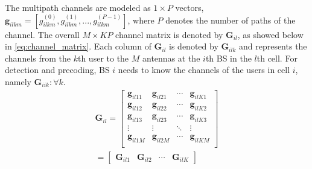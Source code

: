 \documentclass[journal,12pt,onecolumn]{IEEEtran}
\begin{document}
The multipath channels are modeled as $1 \times P$ vectors, $\textbf{g}_{ilkm} = \left[ g_{ilkm}^{(0)}, g_{ilkm}^{(1)}, ..., g_{ilkm}^{(P-1)} \right]$, where $P$ denotes the number of paths of the channel. The overall $M \times KP$ channel matrix is denoted by $\textbf{G}_{il}$, as showed below in \eqref{eq:channel_matrix}. Each column of $\textbf{G}_{il}$ is denoted by $\textbf{G}_{ilk}$ and represents the channels from the $k$th user to the $M$ antennas at the $i$th BS in the $l$th cell. For detection and precoding, BS $i$ needs to know the channels of the users in cell $i$, namely $ \textbf{G}_{iik} : \forall k$.
\begin{equation}\label{eq:channel_matrix}
\begin{split}
\textbf{G}_{il} = \left[\begin{array}{cccc}
\textbf{g}_{il11} & \textbf{g}_{il21} & \cdots & \textbf{g}_{ilK1} \\
\textbf{g}_{il12} & \textbf{g}_{il22} & \cdots & \textbf{g}_{ilK2} \\
\textbf{g}_{il13} & \textbf{g}_{il23} & \cdots & \textbf{g}_{ilK3} \\
\vdots & \vdots & \ddots & \vdots \\
\textbf{g}_{il1M} & \textbf{g}_{il2M} & \cdots & \textbf{g}_{ilKM} \\ \end{array} \right] \\ = \left[\begin{array}{cccc}
\textbf{G}_{il1} & \textbf{G}_{il2} & \cdots & \textbf{G}_{ilK} \end{array} \right] \hspace{10pt} %
\end{split}
\end{equation}


\end{document}

